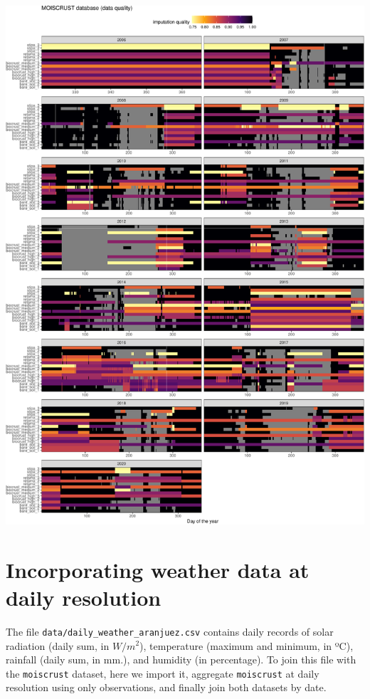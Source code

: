\documentclass[
  table]{article}
\begin{document}
\includegraphics{moiscrust_files/figure-latex/unnamed-chunk-31-1.pdf}

\hypertarget{incorporating-weather-data-at-daily-resolution}{%
\section{Incorporating weather data at daily
resolution}\label{incorporating-weather-data-at-daily-resolution}}

The file \texttt{data/daily\_weather\_aranjuez.csv} contains daily
records of solar radiation (daily sum, in \(W/m^2\)), temperature
(maximum and minimum, in ºC), rainfall (daily sum, in mm.), and humidity
(in percentage). To join this file with the \texttt{moiscrust} dataset,
here we import it, aggregate \texttt{moiscrust} at daily resolution
using only observations, and finally join both datasets by date.
\end{document}
